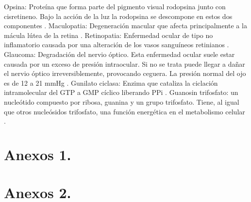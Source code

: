 \documentclass[10pt]{article}
\begin{document}
Opsina: Proteína que forma parte del pigmento visual rodopsina junto con cisretineno. Bajo la acción de la luz la rodopsina se descompone en estos dos componentes \cite{IEEEreferencias:Ref39}.
Maculopatia: Degeneración macular que afecta principalmente a la mácula lútea de la retina \cite{IEEEreferencias:Ref38}.
Retinopatia: Enfermedad ocular de tipo no inflamatorio causada por una alteración de los vasos sanguíneos retinianos \cite{IEEEreferencias:Ref38}.
Glaucoma: Degradación del nervio óptico. Esta enfermedad ocular suele estar causada por un exceso de presión intraocular. Si no se trata puede llegar a dañar el nervio óptico irreversiblemente, provocando ceguera. La presión normal del ojo es de 12 a 21 mmHg \cite{IEEEreferencias:Ref38}.
Gunilato ciclasa: Enzima que cataliza la ciclación intramolecular del GTP a GMP cíclico liberando PPi \cite{IEEEreferencias:Ref39}.
 Guanosin trifosfato: un nucleótido compuesto por ribosa, guanina y un grupo trifosfato. Tiene, al igual que otros nucleósidos trifosfato, una función energética en el metabolismo celular \cite{IEEEreferencias:Ref39}.

 
 

\appendix  
\clearpage %
\addappheadtotoc 
\appendixpage 

\section{Anexos 1.}


\section{Anexos 2.}
\end{document}
